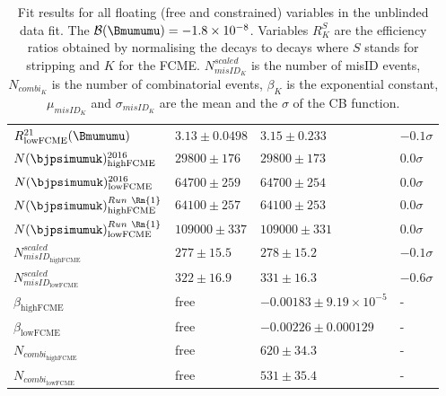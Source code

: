 \begin{table}[H]
\begin{tabular}{ l  l  l l  }
	$ R^{21}_{\mathrm{lowFCME}}(\Bmumumu) $ & $3.13 \pm 0.0498$ & $3.15 \pm 0.233$ & $-0.1\sigma$  \\
	$ N(\bjpsimumuk)^{2016}_{\mathrm{highFCME}} $ & $29800 \pm 176$ & $29800 \pm 173$ & $0.0\sigma$ \\
	$ N(\bjpsimumuk)^{2016}_{\mathrm{lowFCME}} $ & $64700 \pm 259$ & $64700 \pm 254$ & $0.0\sigma$ \\
	$ N(\bjpsimumuk)^{Run\ \Rn{1}}_{\mathrm{highFCME}} $ &  $64100 \pm 257 $ & $64100 \pm 253$ & $0.0\sigma$ \\
	$ N(\bjpsimumuk)^{Run\ \Rn{1}}_{\mathrm{lowFCME}} $ & $109000 \pm 337$ & $109000 \pm 331$ & $0.0\sigma$ \\
	$ N^{scaled}_{misID_{\mathrm{highFCME}}} $ & $277 \pm 15.5$  & $278 \pm 15.2$ & $-0.1\sigma$ \\
	$ N^{scaled}_{misID_{\mathrm{lowFCME}}} $ & $322 \pm 16.9$ & $331 \pm 16.3$ & $-0.6\sigma$ \\
	$ \beta_{\mathrm{highFCME}} $ & free & $-0.00183 \pm 9.19\times 10^{-5}$ & - \\
	$ \beta_{\mathrm{lowFCME}} $ & free & $-0.00226 \pm 0.000129$ & - \\
	$ N_{combi_{\mathrm{highFCME}}} $ & free &   $620 \pm 34.3$ & - \\
	$ N_{combi_{\mathrm{lowFCME}}} $ & free & $531 \pm 35.4$ & - \\
\bottomrule
\end{tabular}
	\caption{Fit results for all floating (free and constrained) variables in the unblinded data fit. The $\mathcal{B}(\Bmumumu) =-1.8\times 10^{-8}$. Variables $R^{S}_{K}$ are the efficiency ratios obtained by normalising the decays to \bjpsimumuk decays where $S$ stands for stripping and $K$ for the FCME. $N^{scaled}_{misID_{K}}$ is the number of misID events, $N_{combi_{K}}$ is the number of combinatorial events, $\beta_{K}$ is the exponential constant, $\mu_{misID_{K}}$ and $\sigma_{misID_{K}}$ are the mean and the $\sigma$ of the CB function.}
\label{tab:floatingparsummary_fit}
\end{table}

